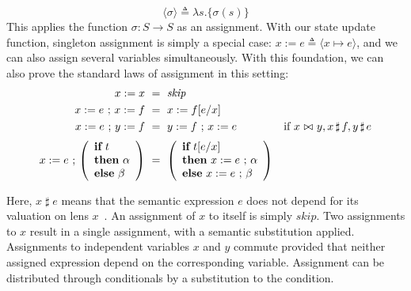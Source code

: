 \documentclass[envcountsame,envcountsect]{llncs}
\newcommand{\sskip}{\mathit{skip}}
\newcommand{\Pow}{\mathcal{P}}
\newcommand{\reals}{\mathbb{R}}
\newcommand{\defs}{\triangleq}
\newcommand{\lindep}{\mathop{\,\bowtie\,}}
\newcommand{\unrest}{\mathop{\sharp}}
\newcommand{\seq}{\mathop{\,;\,}}
\begin{document}
\begin{equation}
  \langle \sigma \rangle \defs \lambda s. \{ \sigma(s) \} \tag{st-assgn}
\end{equation}
%
This applies the function $\sigma : S \to S$ as an assignment. With
our state update function, singleton assignment is simply a special
case: $x := e \defs \langle x \mapsto e \rangle$, and we can also
assign several variables simultaneously. With this foundation, we can
also prove the standard laws of assignment in this setting:
%
\begin{align*}
  x := x &~=~ \sskip \\
  x := e \seq x := f &~=~ x := f[e/x] \\
  x := e \seq y := f &~=~ y := f \seq x := e & \textnormal{if~} x \lindep y, x \unrest f, y \unrest e \\[.5ex]
  x := e \seq \left(\begin{array}{l} \textbf{if}~ t \\ \textbf{then}~ \alpha \\ \textbf{else}~ \beta 
                          \end{array}\right) &~=~ \left(\begin{array}{l} \textbf{if}~ t[e/x] \\ \textbf{then}~ x := e \seq \alpha \\ \textbf{else}~ x := e \seq \beta 
                          \end{array}\right)
\end{align*}

Here, $x \unrest e$ means that the semantic expression $e$ does not
depend for its valuation on lens $x$~\cite{FosterZW16}. An assignment
of $x$ to itself is simply $\sskip$. Two assignments to $x$ result in
a single assignment, with a semantic substitution applied. Assignments
to independent variables $x$ and $y$ commute provided that neither
assigned expression depend on the corresponding variable.  Assignment
can be distributed through conditionals by a substitution to the
condition.

\end{document}
